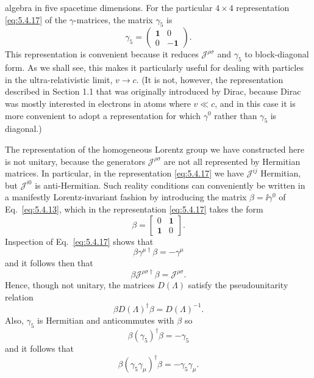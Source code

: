 algebra in five spacetime dimensions. For the particular $4\times4$
representation \eqref{eq:5.4.17} of the $\gamma$-matrices, the matrix $\gamma_5$ is
\begin{equation}
\gamma_5=\begin{pmatrix}\mathbf{1}&0\\0&-\mathbf{1}\end{pmatrix}.
\tag{5.4.28}\label{eq:5.4.28}
\end{equation}
This representation is convenient because it reduces $\mathcal{J}^{\rho\sigma}$
and $\gamma_5$ to block-diagonal form. As we shall see, this makes it
particularly useful for dealing with particles in the ultra-relativistic
limit, $v\to c$. (It is not, however, the representation described in Section
1.1 that was originally introduced by Dirac, because Dirac was mostly
interested in electrons in atoms where $v\ll c$, and in this case it is more
convenient to adopt a representation for which $\gamma^0$ rather than
$\gamma_5$ is diagonal.)

The representation of the homogeneous Lorentz group we have constructed here
is not unitary, because the generators $\mathcal{J}^{\rho\sigma}$ are not all
represented by Hermitian matrices. In particular, in the representation
\eqref{eq:5.4.17} we have $\mathcal{J}^{ij}$ Hermitian, but $\mathcal{J}^{i0}$ is
anti-Hermitian. Such reality conditions can conveniently be written in a
manifestly Lorentz-invariant fashion by introducing the matrix
$\beta=\ii\gamma^0$ of Eq.~\eqref{eq:5.4.13}, which in the representation \eqref{eq:5.4.17} takes
the form
\begin{equation}
\beta=\begin{bmatrix}0&\mathbf{1}\\\mathbf{1}&0\end{bmatrix}.
\tag{5.4.29}\label{eq:5.4.29}
\end{equation}
Inspection of Eq.~\eqref{eq:5.4.17} shows that
\begin{equation}
\beta\gamma^{\mu\dagger}\beta=-\gamma^\mu
\tag{5.4.30}\label{eq:5.4.30}
\end{equation}
and it follows then that
\begin{equation}
\beta\mathcal{J}^{\rho\sigma\dagger}\beta=\mathcal{J}^{\rho\sigma}.
\tag{5.4.31}\label{eq:5.4.31}
\end{equation}
Hence, though not unitary, the matrices $D(\Lambda)$ satisfy the
pseudounitarity relation
\begin{equation}
\beta D(\Lambda)^\dagger\beta=D(\Lambda)^{-1}.
\tag{5.4.32}\label{eq:5.4.32}
\end{equation}
Also, $\gamma_5$ is Hermitian and anticommutes with $\beta$ so
\begin{equation}
\beta(\gamma_5)^\dagger\beta=-\gamma_5
\tag{5.4.33}\label{eq:5.4.33}
\end{equation}
and it follows that
\begin{equation}
\beta(\gamma_5\gamma_\mu)^\dagger\beta=-\gamma_5\gamma_\mu.
\tag{5.4.34}\label{eq:5.4.34}
\end{equation}

